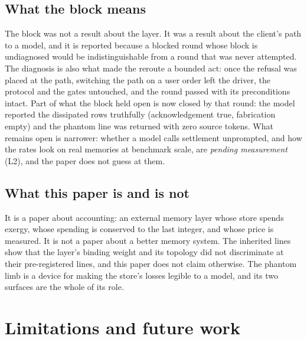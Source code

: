 \documentclass[11pt,a4paper]{article}
\begin{document}
\subsection{What the block means}
The block was not a result about the layer. It was a result about the client's path to a model, and it is reported because a blocked round whose block is undiagnosed would be indistinguishable from a round that was never attempted. The diagnosis is also what made the reroute a bounded act: once the refusal was placed at the path, switching the path on a user order left the driver, the protocol and the gates untouched, and the round passed with its preconditions intact. Part of what the block held open is now closed by that round: the model reported the dissipated rows truthfully (acknowledgement true, fabrication empty) and the phantom line was returned with zero source tokens. What remains open is narrower: whether a model calls settlement unprompted, and how the rates look on real memories at benchmark scale, are \emph{pending measurement} (L2), and the paper does not guess at them.

\subsection{What this paper is and is not}
It is a paper about accounting: an external memory layer whose store spends exergy, whose spending is conserved to the last integer, and whose price is measured. It is not a paper about a better memory system. The inherited lines show that the layer's binding weight and its topology did not discriminate at their pre-registered lines, and this paper does not claim otherwise. The phantom limb is a device for making the store's losses legible to a model, and its two surfaces are the whole of its role.

\section{Limitations and future work}
\label{sec:limitations}
\end{document}
